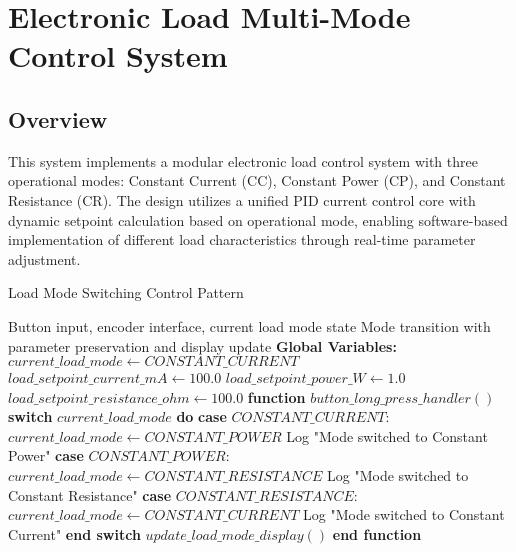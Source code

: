 \documentclass{article}
\begin{document}
\section{Electronic Load Multi-Mode Control System}

\subsection{Overview}

This system implements a modular electronic load control system with three operational modes: Constant Current (CC), Constant Power (CP), and Constant Resistance (CR). The design utilizes a unified PID current control core with dynamic setpoint calculation based on operational mode, enabling software-based implementation of different load characteristics through real-time parameter adjustment.

\begin{algorithm}
\caption{Load Mode Switching Control Pattern}
\label{alg:load_mode_switching}
\begin{algorithmic}[1]
\REQUIRE Button input, encoder interface, current load mode state
\ENSURE Mode transition with parameter preservation and display update
\STATE \textbf{Global Variables:}
\STATE $current\_load\_mode \leftarrow CONSTANT\_CURRENT$ 
\STATE $load\_setpoint\_current\_mA \leftarrow 100.0$ 
\STATE $load\_setpoint\_power\_W \leftarrow 1.0$ 
\STATE $load\_setpoint\_resistance\_ohm \leftarrow 100.0$ 
\STATE
\STATE \textbf{function} $button\_long\_press\_handler()$
\STATE \textbf{switch} $current\_load\_mode$ \textbf{do}
    \STATE \textbf{case} $CONSTANT\_CURRENT$:
    \STATE \quad $current\_load\_mode \leftarrow CONSTANT\_POWER$
    \STATE \quad Log "Mode switched to Constant Power"
    \STATE \textbf{case} $CONSTANT\_POWER$:
    \STATE \quad $current\_load\_mode \leftarrow CONSTANT\_RESISTANCE$
    \STATE \quad Log "Mode switched to Constant Resistance"
    \STATE \textbf{case} $CONSTANT\_RESISTANCE$:
    \STATE \quad $current\_load\_mode \leftarrow CONSTANT\_CURRENT$
    \STATE \quad Log "Mode switched to Constant Current"
\STATE \textbf{end switch}
\STATE $update\_load\_mode\_display()$
\STATE \textbf{end function}
\end{algorithmic}
\end{algorithm}
\end{document}
